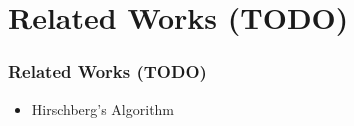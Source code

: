 \section{Related Works (TODO)}

\begin{frame}
    \frametitle{Related Works (TODO)}
    \begin{itemize}
    	\item Hirschberg's Algorithm
    \end{itemize}
\end{frame}